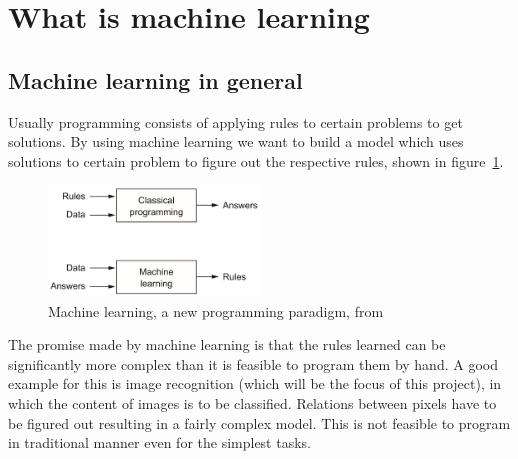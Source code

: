 \section{What is machine learning} \label{ch:what_is_ml}

\subsection{Machine learning in general}

Usually programming consists of applying rules to certain problems to get solutions.
By using machine learning we want to build a model which uses solutions to certain problem to figure out the respective rules, shown in figure~\ref{fig:cp_vs_ml}.

\begin{figure}
    \centering
    \includegraphics[width=0.5\textwidth]{images/classical_prog_vs_ml.png}
    \caption{Machine learning, a new programming paradigm, from
        \cite[p.5]{Chollet2017}}
    \label{fig:cp_vs_ml}
\end{figure}

The promise made by machine learning is that the rules learned can be significantly more complex than it is feasible to program them by hand.
A good example for this is image recognition (which will be the focus of this project), in which the content of images is to be classified.
Relations between pixels have to be figured out resulting in a fairly complex model.
This is not feasible to program in traditional manner even for the simplest tasks.

